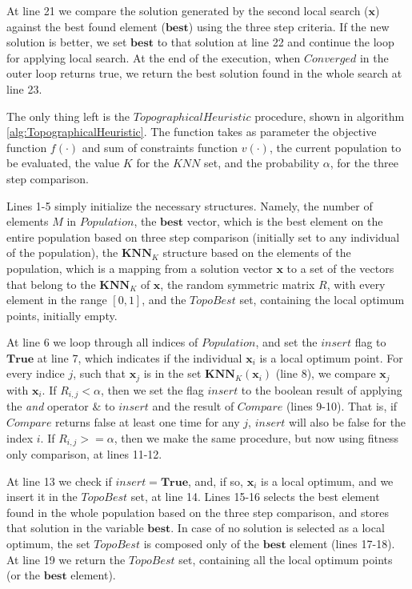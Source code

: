 At line 21 we compare the solution generated by the second local search ($\bm{x}$) against the best found element ($\bm{best}$) using the three step criteria. If the new solution is better, we set $\bm{best}$ to that solution at line 22 and continue the loop for applying local search. At the end of the execution, when $Converged$ in the outer loop returns true, we return the best solution found in the whole search at line 23.

The only thing left is the $TopographicalHeuristic$ procedure, shown in algorithm \ref{alg:TopographicalHeuristic}. The function takes as parameter the objective function $f(\cdot)$ and sum of constraints function $v(\cdot)$, the current population to be evaluated, the value $K$ for the $KNN$ set, and the probability $\alpha$, for the three step comparison.





Lines 1-5 simply initialize the necessary structures. Namely, the number of elements $M$ in $Population$, the $\bm{best}$ vector, which is the best element on the entire population based on three step comparison (initially set to any individual of the population), the $\bm{KNN}_K$ structure based on the elements of the population, which is a mapping from a solution vector $\bm{x}$ to a set of the vectors that belong to the $\bm{KNN}_K$ of $\bm{x}$, the random symmetric matrix $R$, with every element in the range $[0, 1]$, and the $TopoBest$ set, containing the local optimum points, initially empty.

At line 6 we loop through all indices of $Population$, and set the $insert$ flag to $\bm{True}$ at line 7, which indicates if the individual $\bm{x}_i$ is a local optimum point. For every indice $j$, such that $\bm{x}_j$ is in the set $\bm{KNN}_K(\bm{x}_i)$ (line 8), we compare $\bm{x}_j$ with $\bm{x}_i$. If $R_{i, j} < \alpha$, then we set the flag $insert$ to the boolean result of applying the \textit{and} operator $\&$ to $insert$ and the result of $Compare$ (lines 9-10). That is, if $Compare$ returns false at least one time for any $j$, $insert$ will also be false for the index $i$. If $R_{i, j} >= \alpha$, then we make the same procedure, but now using fitness only comparison, at lines 11-12.

At line 13 we check if $insert = \bm{True}$, and, if so, $\bm{x}_i$ is a local optimum, and we insert it in the $TopoBest$ set, at line 14. Lines 15-16 selects the best element found in the whole population based on the three step comparison, and stores that solution in the variable $\bm{best}$. In case of no solution is selected as a local optimum, the set $TopoBest$ is composed only of the $\bm{best}$ element (lines 17-18). At line 19 we return the $TopoBest$ set, containing all the local optimum points (or the $\bm{best}$ element).


